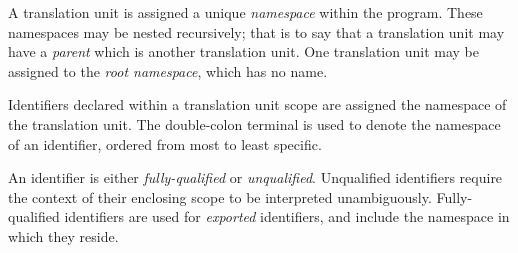 \specsubsubitem
A translation unit is assigned a unique \textit{namespace} within the program.
These namespaces may be nested recursively; that is to say that a translation
unit may have a \textit{parent} which is another translation unit. One
translation unit may be assigned to the \textit{root namespace}, which has no
name.

\specsubsubitem
Identifiers declared within a translation unit scope are assigned the namespace
of the translation unit. The double-colon terminal \terminal{::} is used to
denote the namespace of an identifier, ordered from most to least specific.

\specsubsubitem
An identifier is either \textit{fully-qualified} or \textit{unqualified}.
Unqualified identifiers require the context of their enclosing scope to be
interpreted unambiguously. Fully-qualified identifiers are used for
\textit{exported} identifiers, and include the namespace in which they reside.


